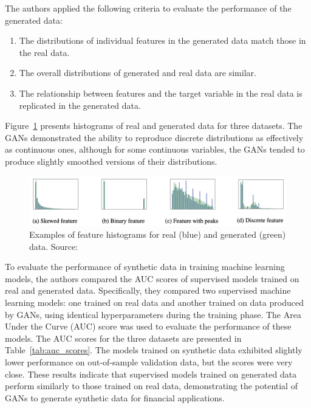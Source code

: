 \documentclass[12pt]{article}
\begin{document}
The authors applied the following criteria to evaluate the performance of the
generated data:
\begin{enumerate}
    \item The distributions of individual features in the generated data match those in
          the real data.
    \item The overall distributions of generated and real data are similar.
    \item The relationship between features and the target variable in the real data is
          replicated in the generated data.
\end{enumerate}

Figure~\ref{fig:ganfinance} presents histograms of real and generated data for
three datasets. The GANs demonstrated the ability to reproduce discrete
distributions as effectively as continuous ones, although for some continuous
variables, the GANs tended to produce slightly smoothed versions of their
distributions.

\begin{figure}[!htbp]
    \centering
    \includegraphics[width=\textwidth]{../Figures/Figure4.png}
    \caption{Examples of feature histograms for real (blue) and generated (green) data. Source: \cite{efimovUsingGenerativeAdversarial2020}}
    \label{fig:ganfinance}
\end{figure}

To evaluate the performance of synthetic data in training machine learning
models, the authors compared the AUC scores of supervised models trained on
real and generated data. Specifically, they compared two supervised machine
learning models: one trained on real data and another trained on data produced
by GANs, using identical hyperparameters during the training phase. The Area
Under the Curve (AUC) score was used to evaluate the performance of these
models. The AUC scores for the three datasets are presented in
Table~\ref{tab:auc_scores}. The models trained on synthetic data exhibited
slightly lower performance on out-of-sample validation data, but the scores
were very close. These results indicate that supervised models trained on
generated data perform similarly to those trained on real data, demonstrating
the potential of GANs to generate synthetic data for financial applications.
\end{document}
